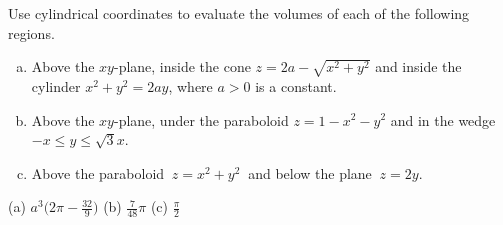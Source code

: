 \begin{question}
Use cylindrical coordinates to evaluate the volumes of each of the following
regions.
\begin{enumerate}[(a)]
\item
Above the $xy$-plane, inside the cone $z=2a-\sqrt{x^2+y^2}$ and
inside the cylinder $x^2+y^2=2ay$, where $a>0$ is a constant.
\item
Above the $xy$-plane, under the paraboloid $z=1-x^2-y^2$ and
in the wedge $-x\le y\le \sqrt{3}x$.
\item
Above the paraboloid $\ z=x^2+y^2\ $ and below the plane $\ z=2y$.
\end{enumerate}
\end{question}

%

\begin{answer}
(a) $a^3\big(2\pi-\frac{32}{9}\big)$ \qquad
(b) $\frac{7}{48}\pi$\qquad
(c) $\frac{\pi}{2}$
\end{answer}

